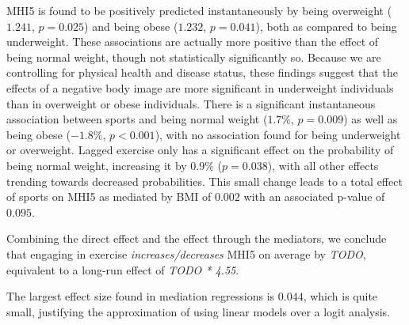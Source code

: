 MHI5 is found to be positively predicted instantaneously by being overweight ($1.241$, $p = 0.025$) and
being obese ($1.232$, $p = 0.041$), both as compared to being underweight. These associations are actually more positive
than the effect of being normal weight, though not statistically significantly so.
Because we are controlling for physical health and disease status, these findings suggest that the effects of a negative
body image are more significant in underweight individuals than in overweight or obese individuals.
There is a significant instantaneous association between sports and being normal weight ($1.7\%$, $p = 0.009$)
as well as being obese ($-1.8\%$, $p < 0.001$), with no association found for being underweight or overweight.
Lagged exercise only has a significant effect on the probability of being normal weight, increasing it by $0.9\%$ ($p = 0.038$),
with all other effects trending towards decreased probabilities.
This small change leads to a total effect of sports on MHI5 as mediated by BMI of $0.002$ with an associated p-value of $0.095$.

Combining the direct effect and the effect through the mediators, we conclude that engaging in exercise \textit{increases/decreases}
MHI5 on average by \textit{TODO}, equivalent to a long-run effect of \textit{TODO * 4.55}.

The largest effect size found in mediation regressions is $0.044$, which is quite small, justifying the approximation
of using linear models over a logit analysis.

